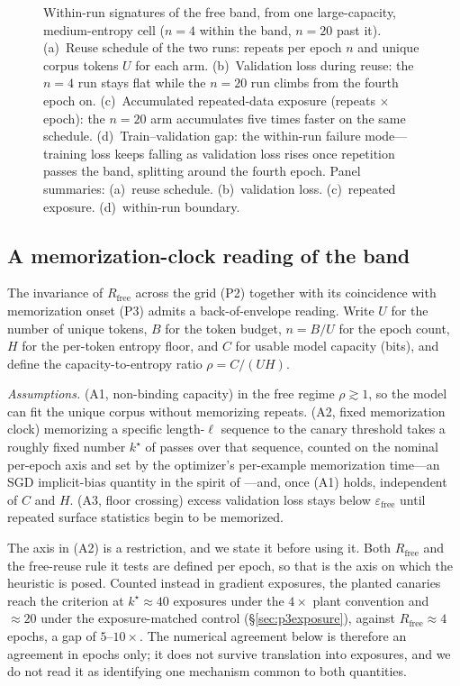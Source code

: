 \documentclass[11pt]{article}
\begin{document}
\begin{figure}[htbp]
\centering
{}
\caption{Within-run signatures of the free band, from one large-capacity,
medium-entropy cell ($n=4$ within the band, $n=20$ past it).
(a)~Reuse schedule of the two runs: repeats per epoch $n$ and unique corpus
tokens $U$ for each arm.
(b)~Validation loss during reuse: the $n=4$ run stays flat while the $n=20$ run
climbs from the fourth epoch on.
(c)~Accumulated repeated-data exposure (repeats $\times$ epoch): the $n=20$
arm accumulates five times faster on the same schedule.
(d)~Train--validation gap: the within-run failure mode---training loss keeps
falling as validation loss rises once repetition passes the band, splitting
around the fourth epoch.
Panel summaries: (a)~reuse schedule. (b)~validation loss. (c)~repeated exposure. (d)~within-run boundary.}
\label{fig:within-run}
\end{figure}

\subsection{A memorization-clock reading of the band}\label{sec:memclock}

The invariance of $R_{\mathrm{free}}$ across the grid (P2) together with its coincidence
with memorization onset (P3) admits a back-of-envelope reading. Write $U$ for the number
of unique tokens, $B$ for the token budget, $n=B/U$ for the epoch count, $H$ for the
per-token entropy floor, and $C$ for usable model capacity (bits), and define the
capacity-to-entropy ratio $\rho = C/(U H)$.

\emph{Assumptions.} (A1, non-binding capacity) in the free regime $\rho \gtrsim 1$, so the
model can fit the unique corpus without memorizing repeats. (A2, fixed memorization clock)
memorizing a specific length-$\ell$ sequence to the canary threshold takes a roughly fixed
number $k^\star$ of passes over that sequence, counted on the nominal per-epoch axis and
set by the optimizer's per-example memorization
time---an SGD implicit-bias quantity in the spirit of \citep{neucom2026sgdbias}---and, once
(A1) holds, independent of $C$ and $H$. (A3, floor crossing) excess validation loss stays
below $\varepsilon_{\mathrm{free}}$ until repeated surface statistics begin to be memorized.

The axis in (A2) is a restriction, and we state it before using it. Both
$R_{\mathrm{free}}$ and the free-reuse rule it tests are defined per epoch, so that is
the axis on which the heuristic is posed. Counted instead in gradient exposures, the
planted canaries reach the criterion at $k^\star \approx 40$ exposures under the
$4\times$ plant convention and $\approx 20$ under the exposure-matched control
(\S\ref{sec:p3exposure}), against $R_{\mathrm{free}} \approx 4$ epochs, a gap of
$5$--$10\times$. The numerical agreement below is therefore an agreement in epochs
only; it does not survive translation into exposures, and we do not read it as
identifying one mechanism common to both quantities.
\end{document}
